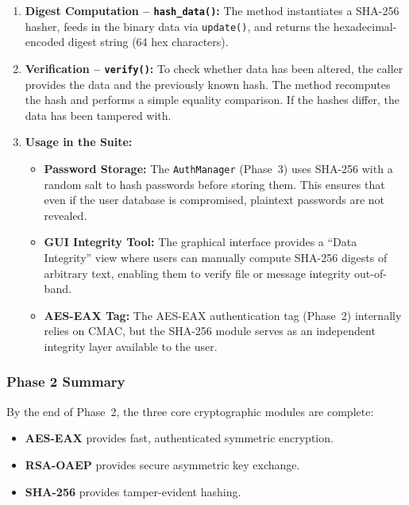 \documentclass[12pt,a4paper]{article}
\begin{document}
\begin{enumerate}
    \item \textbf{Digest Computation – \texttt{hash\_data()}:} The method instantiates a SHA-256 hasher, feeds in the binary data via \texttt{update()}, and returns the hexadecimal-encoded digest string (64 hex characters).
    
    \item \textbf{Verification – \texttt{verify()}:} To check whether data has been altered, the caller provides the data and the previously known hash. The method recomputes the hash and performs a simple equality comparison. If the hashes differ, the data has been tampered with.
    
    \item \textbf{Usage in the Suite:}
    \begin{itemize}
        \item \textbf{Password Storage:} The \texttt{AuthManager} (Phase~3) uses SHA-256 with a random salt to hash passwords before storing them. This ensures that even if the user database is compromised, plaintext passwords are not revealed.
        \item \textbf{GUI Integrity Tool:} The graphical interface provides a ``Data Integrity'' view where users can manually compute SHA-256 digests of arbitrary text, enabling them to verify file or message integrity out-of-band.
        \item \textbf{AES-EAX Tag:} The AES-EAX authentication tag (Phase~2) internally relies on CMAC, but the SHA-256 module serves as an independent integrity layer available to the user.
    \end{itemize}
\end{enumerate}

\subsubsection{Phase 2 Summary}
By the end of Phase~2, the three core cryptographic modules are complete:
\begin{itemize}
    \item \textbf{AES-EAX} provides fast, authenticated symmetric encryption.
    \item \textbf{RSA-OAEP} provides secure asymmetric key exchange.
    \item \textbf{SHA-256} provides tamper-evident hashing.
\end{itemize}

\newpage
\end{document}
